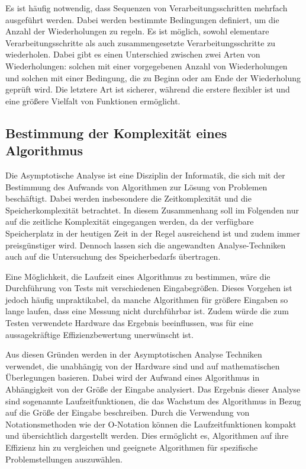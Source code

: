 Es ist häufig notwendig, dass Sequenzen von Verarbeitungsschritten mehrfach ausgeführt werden. Dabei werden bestimmte Bedingungen definiert, um die Anzahl der Wiederholungen zu regeln. Es ist möglich, sowohl elementare Verarbeitungsschritte als auch zusammengesetzte Verarbeitungsschritte zu wiederholen. Dabei gibt es einen Unterschied zwischen zwei Arten von Wiederholungen: solchen mit einer vorgegebenen Anzahl von Wiederholungen und solchen mit einer Bedingung, die zu Beginn oder am Ende der Wiederholung geprüft wird. Die letztere Art ist sicherer, während die erstere flexibler ist und eine größere Vielfalt von Funktionen ermöglicht. \autocite[13-14]{hubwieser_fundamente_2015}

\subsection{Bestimmung der Komplexität eines Algorithmus} \label{o-notation}
Die Asymptotische Analyse ist eine Disziplin der Informatik, die sich mit der Bestimmung des Aufwands von Algorithmen zur Lösung von Problemen beschäftigt. Dabei werden insbesondere die Zeitkomplexität und die Speicherkomplexität betrachtet. In diesem Zusammenhang soll im Folgenden nur auf die zeitliche Komplexität eingegangen werden, da der verfügbare Speicherplatz in der heutigen Zeit in der Regel ausreichend ist und zudem immer preisgünstiger wird. Dennoch lassen sich die angewandten Analyse-Techniken auch auf die Untersuchung des Speicherbedarfs übertragen. \autocite[201]{hubwieser_fundamente_2015}

Eine Möglichkeit, die Laufzeit eines Algorithmus zu bestimmen, wäre die Durchführung von Tests mit verschiedenen Eingabegrößen. Dieses Vorgehen ist jedoch häufig unpraktikabel, da manche Algorithmen für größere Eingaben so lange laufen, dass eine Messung nicht durchführbar ist. Zudem würde die zum Testen verwendete Hardware das Ergebnis beeinflussen, was für eine aussagekräftige Effizienzbewertung unerwünscht ist.\autocite[201]{hubwieser_fundamente_2015}

Aus diesen Gründen werden in der Asymptotischen Analyse Techniken verwendet, die unabhängig von der Hardware sind und auf mathematischen Überlegungen basieren. Dabei wird der Aufwand eines Algorithmus in Abhängigkeit von der Größe der Eingabe analysiert. Das Ergebnis dieser Analyse sind sogenannte Laufzeitfunktionen, die das Wachstum des Algorithmus in Bezug auf die Größe der Eingabe beschreiben. Durch die Verwendung von Notationsmethoden wie der O-Notation können die Laufzeitfunktionen kompakt und übersichtlich dargestellt werden. Dies ermöglicht es, Algorithmen auf ihre Effizienz hin zu vergleichen und geeignete Algorithmen für spezifische Problemstellungen auszuwählen.\autocite[201-203]{hubwieser_fundamente_2015}

